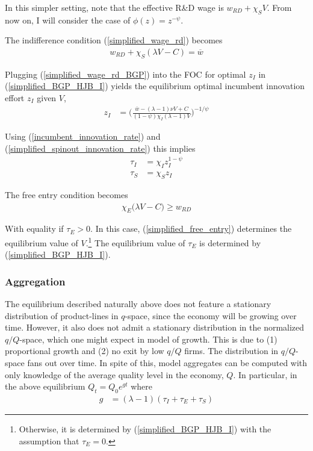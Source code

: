 \documentclass[11pt,english]{article}
\theoremstyle{remark}
\begin{document}
In this simpler setting, note that the effective R\&D wage is $w_{RD} + \chi_S V$. From now on, I will consider the case of $\phi(z) = z^{-\psi}$. 

The indifference condition (\ref{simplified_wage_rd}) becomes 
\begin{align}
	w_{RD} + \chi_S (\lambda V - C) = \overline{w} \label{simplified_wage_rd_BGP}
\end{align}

Plugging (\ref{simplified_wage_rd_BGP}) into the FOC for optimal $z_I$ in (\ref{simplified_BGP_HJB_I}) yields the equilibrium optimal incumbent innovation effort $z_I$ given $V$, 
\begin{align*}
	z_I &= \Big(  \frac{\bar{w}-(\lambda-1)\nu V + C}{(1-\psi)\chi_I(\lambda-1)V} \Big)^{-1/\psi}	
\end{align*}

Using (\ref{incumbent_innovation_rate}) and (\ref{simplified_spinout_innovation_rate}) this implies
\begin{align*}
	\tau_I &= \chi_I z_I^{1-\psi} \\
	\tau_S &= \chi_S z_I
\end{align*}

The free entry condition becomes
\begin{align}
	\chi_E \Big( \lambda V -  C \Big) \ge w_{RD} \label{simplified_free_entry}
\end{align}

With equality if $\tau_E > 0$. In this case, (\ref{simplified_free_entry}) determines the equilibrium value of $V$.\footnote{Otherwise, it is determined by (\ref{simplified_BGP_HJB_I}) with the assumption that $\tau_E = 0$.} The equilibrium value of $\tau_E$ is determined by (\ref{simplified_BGP_HJB_I}).

\subsubsection{Aggregation}

The equilibrium described naturally above does not feature a stationary distribution of product-lines in $q$-space, since the economy will be growing over time. However, it also does not admit a stationary distribution in the normalized $q/Q$-space, which one might expect in model of growth. This is due to (1) proportional growth and (2) no exit by low $q/Q$ firms. The distribution in $q/Q$-space fans out over time. In spite of this, model aggregates can be computed with only knowledge of the average quality level in the economy, $Q$. In particular, in the above equilibrium $Q_t = Q_0 e^{gt}$ where 
\begin{align}
	g &= (\lambda -1) (\tau_I + \tau_E + \tau_S) \label{simplified_growth_aggregation}
\end{align} 
\end{document}
